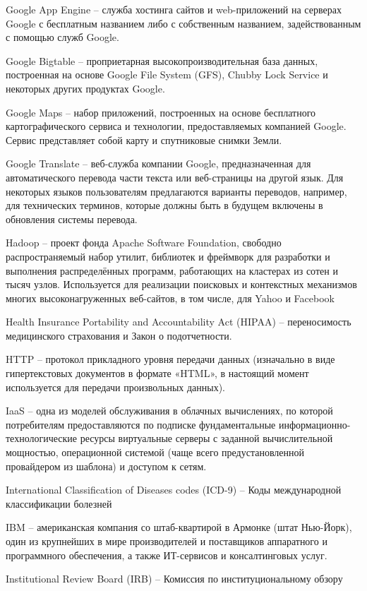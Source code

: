 Google App Engine -- служба хостинга сайтов и web-приложений на серверах Google с бесплатным названием либо с собственным названием, задействованным с помощью служб Google.

Google Bigtable -- проприетарная высокопроизводительная база данных, построенная на основе Google File System (GFS), Chubby Lock Service и некоторых других продуктах Google. 

Google Maps -- набор приложений, построенных на основе бесплатного картографического сервиса и технологии, предоставляемых компанией Google. Сервис представляет собой карту и спутниковые снимки Земли.

Google Translate --  веб-служба компании Google, предназначенная для автоматического перевода части текста или веб-страницы на другой язык. Для некоторых языков пользователям предлагаются варианты переводов, например, для технических терминов, которые должны быть в будущем включены в обновления системы перевода.

Hadoop -- проект фонда Apache Software Foundation, свободно распространяемый набор утилит, библиотек и фреймворк для разработки и выполнения распределённых программ, работающих на кластерах из сотен и тысяч узлов. Используется для реализации поисковых и контекстных механизмов многих высоконагруженных веб-сайтов, в том числе, для Yahoo и Facebook

Health Insurance Portability and Accountability Act (HIPAA) -- переносимость медицинского страхования и Закон о подотчетности.

HTTP -- протокол прикладного уровня передачи данных (изначально в виде гипертекстовых документов в формате «HTML», в настоящий момент используется для передачи произвольных данных).

IaaS -- одна из моделей обслуживания в облачных вычислениях, по которой потребителям предоставляются по подписке фундаментальные информационно-технологические ресурсы виртуальные серверы с заданной вычислительной мощностью, операционной системой (чаще всего предустановленной провайдером из шаблона) и доступом к сетям.

International Classification of Diseases codes (ICD-9) -- Коды международной классификации болезней

IBM -- американская компания со штаб-квартирой в Армонке (штат Нью-Йорк), один из крупнейших в мире производителей и поставщиков аппаратного и программного обеспечения, а также ИТ-сервисов и консалтинговых услуг.

Institutional Review Board (IRB) -- Комиссия по институциональному обзору

